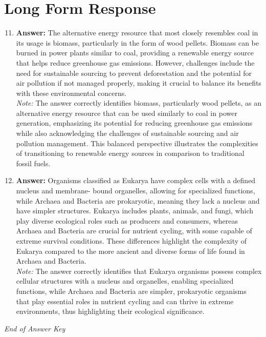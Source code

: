 \documentclass[12pt]{article}
\begin{document}
\section*{Long Form Response}
\begin{enumerate}[label=\arabic*.]
\setcounter{enumi}{10}
\item \textbf{Answer:} The alternative energy resource that most closely resembles coal in its usage is biomass, particularly in the form of wood pellets. Biomass can be burned in power plants similar to coal, providing a renewable energy source that helps reduce greenhouse gas emissions. However, challenges include the need for sustainable sourcing to prevent deforestation and the potential for air pollution if not managed properly, making it crucial to balance its benefits with these environmental concerns.
\\ \textit{Note:} The answer correctly identifies biomass, particularly wood pellets, as an alternative energy resource that can be used similarly to coal in power generation, emphasizing its potential for reducing greenhouse gas emissions while also acknowledging the challenges of sustainable sourcing and air pollution management. This balanced perspective illustrates the complexities of transitioning to renewable energy sources in comparison to traditional fossil fuels.
\item \textbf{Answer:} Organisms classified as Eukarya have complex cells with a defined nucleus and membrane- bound organelles, allowing for specialized functions, while Archaea and Bacteria are prokaryotic, meaning they lack a nucleus and have simpler structures. Eukarya includes plants, animals, and fungi, which play diverse ecological roles such as producers and consumers, whereas Archaea and Bacteria are crucial for nutrient cycling, with some capable of extreme survival conditions. These differences highlight the complexity of Eukarya compared to the more ancient and diverse forms of life found in Archaea and Bacteria.
\\ \textit{Note:} The answer correctly identifies that Eukarya organisms possess complex cellular structures with a nucleus and organelles, enabling specialized functions, while Archaea and Bacteria are simpler, prokaryotic organisms that play essential roles in nutrient cycling and can thrive in extreme environments, thus highlighting their ecological significance.
\end{enumerate}

\vfill
\noindent\textit{End of Answer Key}
\end{document}
